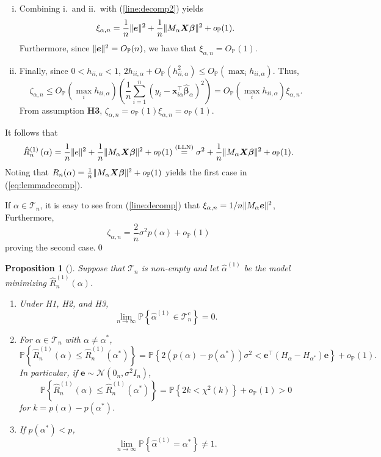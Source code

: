\documentclass[11pt, letter paper]{article}
\newcommand{\1}{\mathmybb{1}}
\newtheorem{proposition}{Proposition}[section]
\newcommand{\0}{\emptyset}
\newcommand{\prob}{\mathbb{P}}
\newcommand{\paren}[1]{\left(#1 \right)}
\newcommand{\set}[1]{\left\{ #1 \right\}}
\newcommand{\norm}[1]{|\hspace{-1pt}|#1 |\hspace{-1pt}|}
\newcommand{\normsq}[1]{\norm{#1}^{2}}
\newcommand{\Tcal}{\mathcal{T}_{n}}
\newcommand{\Ncal}{\mathcal{N}}
\newcommand{\X}{\boldsymbol{X}}
\newcommand{\x}{\boldsymbol{x}}
\newcommand{\e}{\boldsymbol{e}}
\newcommand{\bbeta}{\boldsymbol{\beta}}
\newcommand{\bbetahat}{\boldsymbol{\hat{\beta}}}
\newcommand{\alphahat}[1]{\hat{\alpha}^{#1}}
\newcommand{\lev}{h_{ii,\alpha}}
\newcommand{\loocv}[1]{\hat{R}^{(1)}_{n}\paren{#1}}
\newcommand{\op}[1]{o_{\prob}\paren{#1}}
\newcommand{\Op}[1]{O_{\prob}\paren{#1}}
\begin{document}
\begin{myproofbox}
\begin{enumerate}[i.]
        \item Combining i.\ and ii.\ with (\ref{line:decomp2}) yields \[\xi_{\alpha,n} = \frac{1}{n}\normsq{\e} + \frac{1}{n}\normsq{M_{\alpha}\X\bbeta} + o_{\prob}(1).\] Furthermore, since \(\normsq{\e} = O_{\prob}(n)\), we have that \(\xi_{\alpha,n} = O_{\prob}(1)\).
        \item Finally, since \(0<\lev<1\), \(2\lev + \Op{\lev^{2}}\leq\Op{\max_{i}\lev}\). Thus,
        \[\zeta_{\alpha,n}\leq\Op{\max_{i}\lev}\paren{\frac{1}{n}\sum_{i=1}^{n}\paren{y_{i} - \x_{i\alpha}^{\top}\bbetahat_{\alpha}}^{2}} = \Op{\max_{i}\lev}\xi_{\alpha,n}.\]
        From assumption \textbf{H3}, \(\zeta_{\alpha,n} = o_{\prob}(1)\xi_{\alpha,n} = o_{\prob}(1)\).
    \end{enumerate}
    It follows that 
    \[\loocv{\alpha} = \frac{1}{n}\normsq{e} + \frac{1}{n}\normsq{M_{\alpha}\X\bbeta} + o_{\prob}(1) \stackrel{(\mathrm{LLN})}{=} \sigma^{2} + \frac{1}{n}\normsq{M_{\alpha}\X\bbeta} + o_{\prob}(1).\]
    Noting that \(R_{n}(\alpha) = \frac{1}{n}\normsq{M_{\alpha}\X\bbeta} + o_{\prob}(1)\) yields the first case in (\ref{eq:lemmadecomp}).

    If \(\alpha\in\Tcal\), it is easy to see from (\ref{line:decomp}) that \(\xi_{\alpha,n} = 1/n\normsq{M_{\alpha}\e}\), Furthermore,
    \[\zeta_{\alpha,n} = \frac{2}{n}\sigma^{2}p(\alpha) + \op{1}\]
    proving the second case.\qed{}
\end{myproofbox}

\begin{proposition}[\cite{shao_1993}]\label{prop:shao93main}
    Suppose that \(\Tcal\) is non-empty and let \(\alphahat{(1)}\) be the model minimizing \(\loocv{\alpha}\).
    \begin{enumerate}
        \item Under H1, H2, and H3, \[\lim_{n\to\infty}\prob\set{\alphahat{(1)}\in\Tcal^{c}}=0.\]
        \item For \(\alpha\in\Tcal\) with \(\alpha\neq\alpha^{*}\),\[\prob\set{\loocv{\alpha}\leq \loocv{\alpha^{*}}} = \prob\set{2\paren{p(\alpha) - p(\alpha^{*})}\sigma^{2} < \e^{\top}(H_{\alpha} - H_{\alpha^{*}})\e} + \op{1}.\] In particular, if \(\e\sim\Ncal(0_{n}, \sigma^{2}I_n)\), \[\prob\set{\loocv{\alpha}\leq \loocv{\alpha^{*}}} = \prob\set{2k < \chi^{2}(k)} + \op{1} > 0\] for \(k=p(\alpha) - p(\alpha^{*})\).
        \item If \(p(\alpha^*) < p\), \[\lim_{n\to\infty}\prob\set{\alphahat{(1)}=\alpha^{*}}\neq 1.\]
    \end{enumerate}
\end{proposition}
\end{document}
